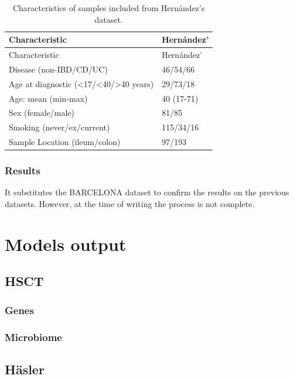 \documentclass[
  12pt,
  a4paper,
  twoside,
  openright]{book}
\begin{document}
\begin{longtable}[]{@{}ll@{}}
\caption{\label{tab:hernandez} Characteristics of samples included from Hernández's dataset.}\tabularnewline
\toprule
Characteristic & Hernández' \\
\midrule
\endfirsthead
\toprule
Characteristic & Hernández' \\
\midrule
\endhead
Disease (non-IBD/CD/UC) & 46/54/66 \\
Age at diagnostic (\textless17/\textless40/\textgreater40 years) & 29/73/18 \\
Age: mean (min-max) & 40 (17-71) \\
Sex (female/male) & 81/85 \\
Smoking (never/ex/current) & 115/34/16 \\
Sample Location (ileum/colon) & 97/193 \\
\bottomrule
\end{longtable}

\hypertarget{results-hernandez}{%
\subsection{Results}\label{results-hernandez}}

It substitutes the BARCELONA dataset to confirm the results on the previous datasets.
However, at the time of writing the process is not complete.

\hypertarget{models-output}{%
\chapter{Models output}\label{models-output}}

\hypertarget{hsct}{%
\section{HSCT}\label{hsct}}

\hypertarget{genes}{%
\subsection{Genes}\label{genes}}

\hypertarget{microbiome-2}{%
\subsection{Microbiome}\label{microbiome-2}}

\hypertarget{huxe4sler}{%
\section{Häsler}\label{huxe4sler}}
\end{document}
